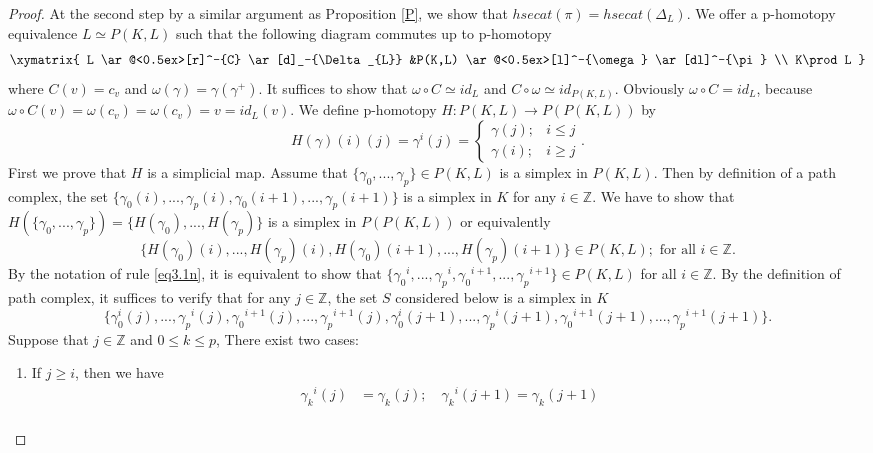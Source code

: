 \documentclass[preprint,11pt %
]{hjm1}
\theoremstyle{definition}
\begin{document}
\begin{proof}
At the second step by a similar argument as Proposition \ref{P}, we show that $hsecat (\pi) = hsecat (\Delta_L)$. We offer a p-homotopy equivalence 
$L\simeq P(K,L)$ 
such that the following diagram  commutes up to p-homotopy
\[
\xymatrix{
L \ar@<0.5ex>[r]^-{C} \ar[d]_-{\Delta _{L}}  &P(K,L) \ar@<0.5ex>[l]^-{\omega} \ar[dl]^-{\pi} \\
K\prod  L
}
\]
where
$C(v)=c_{v}$
and
$\omega(\gamma)=\gamma (\gamma^+)$.
It suffices to show that $\omega \circ C\simeq id_{L}$ and $C\circ \omega\simeq id_{P(K,L)}$.
Obviously $\omega \circ C = id_L$, because $\omega \circ C(v)=\omega(c_{v})=\omega (c_{v})=v=id_{L}(v)$. We define p-homotopy $H:P(K,L)\to P(P(K,L))$ by 
\begin{equation}\label{eq3.1n}
H(\gamma)(i)(j)=\gamma^{i}(j)=
\begin{cases} 
\gamma (j); & i\leq j\\
\gamma (i); & i\geq j
 \end{cases}.
\end{equation}
First we prove that $H$ is a simplicial map.
Assume that $\lbrace \gamma _{0}, ...,\gamma _{p}  \rbrace\in P(K,L)$ is a simplex in $P(K,L)$. Then by definition of a path complex, the set
$
\lbrace \gamma _{0}(i),...,\gamma _{p}(i),\gamma _{0}(i+1),...,\gamma _{p}(i+1)   \rbrace$
is a simplex in $K$ for any $i\in \mathbb{Z}$.
We have to show that $H(\lbrace \gamma _{0}, ...,\gamma _{p} \rbrace )=\lbrace H(\gamma _{0}),...,H(\gamma _{p}) \rbrace $ is a simplex in $P(P(K,L))$ or equivalently
\[
\lbrace H(\gamma _{0})(i),...,H(\gamma _{p})(i),H(\gamma _{0})(i+1),...,H(\gamma _{p})(i+1)   \rbrace \in P(K,L); \text{  for all } i\in \mathbb{Z}.
\]
By the notation of rule \eqref{eq3.1n}, it is equivalent to show that
$\lbrace {\gamma _{0}}^{i},...,{\gamma _{p}}^{i},{\gamma _{0}}^{i+1},...,{\gamma _{p}}^{i+1} \rbrace \in P(K,L)$  for all $i\in \mathbb{Z}$. By the definition of path complex, it suffices to verify that for any $ j\in \mathbb{Z}$,
the set $S$ considered below is a simplex in $K$
\[
\{ \gamma _{0}^{i}(j),...,{\gamma _{p}}^{i}(j),{\gamma _{0}}^{i+1}(j),...,{\gamma _{p}}^{i+1}(j) ,\gamma _{0}^{i}(j+1),...,{\gamma _{p}}^{i}(j+1),{\gamma _{0}}^{i+1}(j+1),...,{\gamma _{p}}^{i+1}(j+1)\}.
 \]
 Suppose that $j\in \mathbb{Z}$ and $0\leq k\leq p$, There exist two cases:
 \begin{enumerate}
 \item[(i)]
 If $j\geq i$, then we have 
 \begin{align*}
 {\gamma _{k}}^{i}(j)&=\gamma _{k}(j);\quad {\gamma _{k}}^{i}(j+1)=\gamma _{k}(j+1)\\

\end{align*}
\end{enumerate}
\end{proof}
\end{document}
